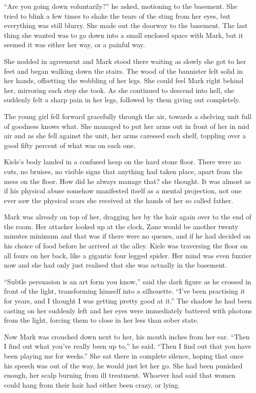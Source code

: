 ``Are you going down voluntarily?'' he asked, motioning to the basement.  She tried to blink a few times to shake the tears of the sting from her eyes, but everything was still blurry.  She made out the doorway to the basement.  The last thing she wanted was to go down into a small enclosed space with Mark, but it seemed it was either her way, or a painful way.

She nodded in agreement and Mark stood there waiting as slowly she got to her feet and began walking down the stairs.  The wood of the bannister felt solid in her hands, offsetting the wobbling of her legs.  She could feel Mark right behind her, mirroring each step she took.  As she continued to descend into hell, she suddenly felt a sharp pain in her legs, followed by them giving out completely.

The young girl fell forward gracefully through the air, towards a shelving unit full of goodness knows what.  She managed to put her arms out in front of her in mid air and as she fell against the unit, her arms caressed each shelf, toppling over a good fifty percent of what was on each one.

Kiele's body landed in a confused heap on the hard stone floor.  There were no cuts, no bruises, no visible signs that anything had taken place, apart from the mess on the floor.  How did he always manage that? she thought.  It was almost as if his physical abuse somehow manifested itself as a mental projection, not one ever saw the physical scars she received at the hands of her so called father.

Mark was already on top of her, dragging her by the hair again over to the end of the room.  Her attacker looked up at the clock, Zane would be another twenty minutes minimum and that was if there were no queues, and if he had decided on his choice of food before he arrived at the alley.  Kiele was traversing the floor on all fours on her back, like a gigantic four legged spider.  Her mind was even fuzzier now and she had only just realised that she was actually in the basement.

``Subtle persuasion is an art form you know,'' said the dark figure as he crossed in front of the light, transforming himself into a silhouette.  ``I've been practising it for years, and I thought I was getting pretty good at it.''  The shadow he had been casting on her suddenly left and her eyes were immediately battered with photons from the light, forcing them to close in her less than sober state.

Now Mark was crouched down next to her, his mouth inches from her ear.  ``Then I find out what you've really been up to,'' he said.  ``Then I find out that you have been playing me for weeks.''  She sat there in complete silence, hoping that once his speech was out of the way, he would just let her go.  She had been punished enough, her scalp burning from ill treatment.  Whoever had said that women could hang from their hair had either been crazy, or lying.

